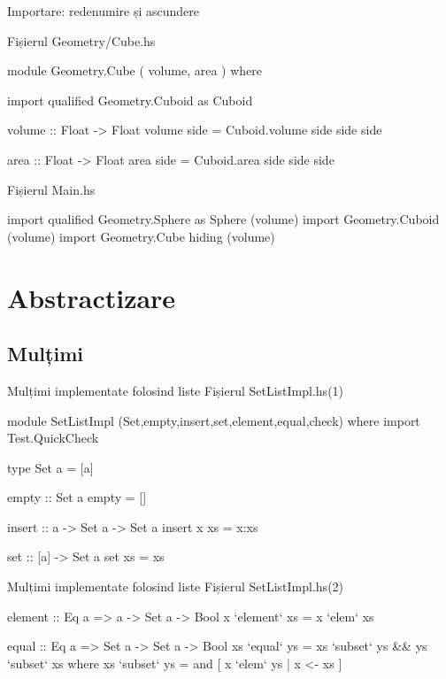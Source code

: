 \documentclass[handout,xcolor=pdftex,romanian,colorlinks]{beamer}
\begin{document}
\begin{frame}[fragile]{Importare: redenumire și ascundere}
\begin{block}
{Fișierul Geometry/Cube.hs}
\vspace{-2ex}
\begin{asciihs}
module Geometry.Cube ( volume, area ) where  

import qualified Geometry.Cuboid as Cuboid

volume :: Float -> Float  
volume side = Cuboid.volume side side side  
  
area :: Float -> Float  
area side = Cuboid.area side side side  
\end{asciihs}
\end{block}
\begin{block}
{Fișierul Main.hs}
\vspace{-2ex}
\begin{asciihs}
import qualified Geometry.Sphere as Sphere (volume)
import Geometry.Cuboid (volume)
import Geometry.Cube hiding (volume)
\end{asciihs}
\end{block}
\end{frame}

\section{Abstractizare}

\subsection{Mulțimi}

\begin{frame}[fragile]{Mulțimi implementate folosind liste}
{Fișierul SetListImpl.hs\hfill (1)}
\begin{asciihs}
module SetListImpl
(Set,empty,insert,set,element,equal,check) where
import Test.QuickCheck

type Set a = [a]

empty :: Set a
empty = []

insert :: a -> Set a -> Set a
insert x xs = x:xs

set :: [a] -> Set a
set xs = xs
\end{asciihs}
\end{frame}


\begin{frame}[fragile]{Mulțimi implementate folosind liste}
{Fișierul SetListImpl.hs\hfill (2)}
\begin{asciihs}
element :: Eq a => a -> Set a -> Bool
x `element` xs = x `elem` xs

equal :: Eq a => Set a -> Set a -> Bool
xs `equal` ys = xs `subset` ys && ys `subset` xs
  where
    xs `subset` ys = and [ x `elem` ys | x <- xs ]
\end{asciihs}
\end{frame}
\end{document}
